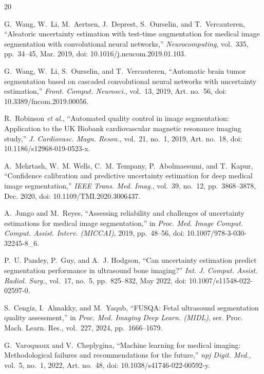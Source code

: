 \documentclass[journal,twoside]{IEEEtran}
\begin{document}
\begin{thebibliography}{20}

G.~Wang, W.~Li, M.~Aertsen, J.~Deprest, S.~Ourselin, and T.~Vercauteren, ``Aleatoric uncertainty estimation with
test-time augmentation for medical image segmentation with convolutional neural networks,''
\emph{Neurocomputing}, vol.~335, pp.~34--45, Mar. 2019, doi: 10.1016/j.neucom.2019.01.103.

G.~Wang, W.~Li, S.~Ourselin, and T.~Vercauteren, ``Automatic brain tumor segmentation based on cascaded
convolutional neural networks with uncertainty estimation,'' \emph{Front. Comput. Neurosci.}, vol.~13, 2019,
Art. no.~56, doi: 10.3389/fncom.2019.00056.

R.~Robinson \emph{et al.}, ``Automated quality control in image segmentation: Application to the UK Biobank
cardiovascular magnetic resonance imaging study,'' \emph{J. Cardiovasc. Magn. Reson.}, vol.~21, no.~1, 2019,
Art. no.~18, doi: 10.1186/s12968-019-0523-x.

A.~Mehrtash, W.~M. Wells, C.~M. Tempany, P.~Abolmaesumi, and T.~Kapur, ``Confidence calibration and predictive
uncertainty estimation for deep medical image segmentation,'' \emph{IEEE Trans. Med. Imag.}, vol.~39, no.~12,
pp.~3868--3878, Dec. 2020, doi: 10.1109/TMI.2020.3006437.

A.~Jungo and M.~Reyes, ``Assessing reliability and challenges of uncertainty estimations for medical image
segmentation,'' in \emph{Proc. Med. Image Comput. Comput. Assist. Interv. (MICCAI)}, 2019, pp.~48--56,
doi: 10.1007/978-3-030-32245-8\_6.

P.~U. Pandey, P.~Guy, and A.~J. Hodgson, ``Can uncertainty estimation predict segmentation performance in
ultrasound bone imaging?'' \emph{Int. J. Comput. Assist. Radiol. Surg.}, vol.~17, no.~5, pp.~825--832, May 2022,
doi: 10.1007/s11548-022-02597-0.

S.~Cengiz, I.~Almakky, and M.~Yaqub, ``FUSQA: Fetal ultrasound segmentation quality assessment,'' in \emph{Proc.
Med. Imaging Deep Learn. (MIDL)}, ser. Proc. Mach. Learn. Res., vol.~227, 2024, pp.~1666--1679.

G.~Varoquaux and V.~Cheplygina, ``Machine learning for medical imaging: Methodological failures and
recommendations for the future,'' \emph{npj Digit. Med.}, vol.~5, no.~1, 2022, Art. no.~48,
doi: 10.1038/s41746-022-00592-y.


\end{thebibliography}
\end{document}
